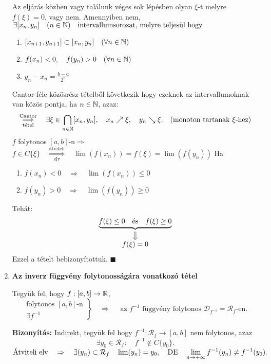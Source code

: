 \documentclass[a4paper,11.5pt]{article}
\begin{document}
\begin{enumerate}
		\medskip
		Az eljárás közben vagy találunk véges sok lépésben olyan  $\xi$-t melyre $f(\xi)=0$, vagy nem. Amennyiben nem,
		$\exists[x_n,y_n]\quad (n\in\mathbb{N}) \quad \text{intervallumsorozat, melyre teljesül hogy}$
		\begin{enumerate}
			\item $[x_{n+1}, y_{n+1}]\subset[x_n,y_n]\quad (\forall n\in\mathbb{N})$
			\item $f(x_n)<0,\quad f(y_n)>0\quad (\forall n\in\mathbb{N})$
			\item $y_n-x_n=\displaystyle \frac{b-a}{2^n}$
		\end{enumerate}
		Cantor-féle közösrész tételből következik hogy ezeknek az intervallumoknak van közös pontja, ha $n\in\mathbb{N}$, azaz:
		\[ \overset{\text{Cantor}}{\underset{\text{tétel}}{\Longrightarrow}}\quad \exists\xi\in\bigcap_{n\in\mathbb{N}}[x_n,y_n],\quad x_n\nearrow\xi, \quad y_n\searrow\xi. \quad (\text{monoton tartanak $\xi$-hez})\]
		$f$ folytonos $[a,b]$-n\quad $\Rightarrow$ \quad $f\in C\{\xi \} \quad \overset{\text{átviteli}}{\underset{\text{elv}}{\Longrightarrow}}\quad \lim(f(x_n))=f(\xi)=\lim(f(y_n))$
		Ha
		\begin{enumerate}
			\item $f(x_n)< 0\quad \Rightarrow\quad \lim(f(x_n))\leq0$
			\item $f(y_n)>0\quad \Rightarrow\quad \lim(f(y_n))\geq 0$
		\end{enumerate}
		Tehát:
		\[\underbrace{f(\xi)\leq 0 \quad \text{és}\quad f(\xi)\geq0}_{\substack{\big\Downarrow\\\displaystyle f(\xi)=0}}\]
		Ezzel a tételt bebizonyítottuk. \quad $\blacksquare$
		\item \textbf{Az inverz függvény folytonosságára vonatkozó tétel}
		
		
		Tegyük fel, hogy $f:[a,b]\to\mathbb{R}$,
		\[\left.\begin{gathered}
		\text{folytonos } [a,b]\text{-n}\\
		\exists f^{-1}
		\end{gathered}\right\}\quad \Rightarrow\quad \text{ az }f^{-1}\text{ függvény folytonos }\mathcal{D}_{f^{-1}}=\mathcal{R}_f\text{-en.}\]
		
		\textbf{Bizonyítás:} Indirekt, tegyük fel hogy $f^{-1}: \mathcal{R}_f\to[a,b]$ nem folytonos, azaz
		\[ \exists y_0\in\mathcal{R}_f:\quad f^{-1}\notin C\{y_0\}. \]
		$\text{Átviteli elv}\quad \Rightarrow\quad \exists(y_n)\subset\mathcal{R}_f\quad  \lim(y_n)=y_0,\quad \text{DE}\quad \displaystyle\lim_{n\to +\infty} f^{-1}(y_n)\not= f^{-1}(y_0).$
		

\end{enumerate}
\end{document}
